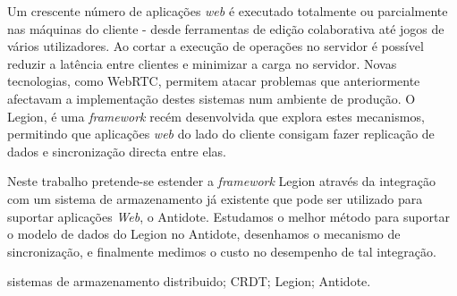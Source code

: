 Um crescente número de aplicações \textit{web} é executado totalmente ou parcialmente nas máquinas do cliente - desde ferramentas de edição colaborativa até jogos de vários utilizadores. Ao cortar a execução de operações no servidor é possível reduzir a latência entre clientes e minimizar a carga no servidor. Novas tecnologias, como WebRTC, permitem atacar problemas que anteriormente afectavam a implementação destes sistemas num ambiente de produção. O Legion, é uma \textit{framework} recém desenvolvida que explora estes mecanismos, permitindo que aplicações \textit{web} do lado do cliente consigam fazer replicação de dados e sincronização directa entre elas.\par
	Neste trabalho pretende-se estender a \textit{framework} Legion através da integração com um sistema de armazenamento já existente que pode ser utilizado para suportar aplicações \textit{Web}, o Antidote. Estudamos o melhor método para suportar o modelo de dados do Legion no Antidote, desenhamos o mecanismo de sincronização, e finalmente medimos o custo no desempenho de tal integração.

\begin{keywords}
sistemas de armazenamento distribuido; CRDT; Legion; Antidote.
\end{keywords}
